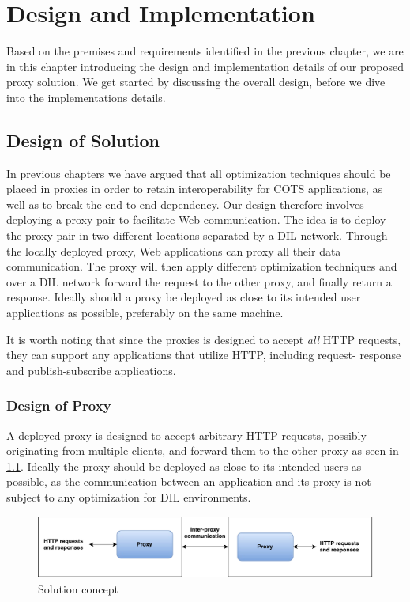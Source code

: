 \chapter{Design and Implementation}
\label{chapter:design}

Based on the premises and requirements identified in the previous chapter, we
are in this chapter introducing the design and implementation details of our
proposed proxy solution. We get started by discussing the overall design, before
we dive into the implementations details.

\section{Design of Solution}

In previous chapters we have argued that all optimization techniques should be
placed in proxies in order to retain interoperability for COTS applications, as
well as to break the end-to-end dependency. Our design therefore involves
deploying a proxy pair to facilitate Web communication. The idea is to deploy
the proxy pair in two different locations separated by a DIL network. Through
the locally deployed proxy, Web applications can proxy all their data
communication. The proxy will then apply different optimization techniques and
over a DIL network forward the request to the other proxy, and finally return a
response. Ideally should a proxy be deployed as close to its intended user
applications as possible, preferably on the same machine.

It is worth noting that since the proxies is designed to accept \textit{all} HTTP
requests, they can support any applications that utilize HTTP, including request-
response and publish-subscribe applications.


\subsection{Design of Proxy}

A deployed proxy is designed to accept arbitrary HTTP requests, possibly
originating from multiple clients, and forward them to the other proxy as seen
in \cref{figure:proxy_design}. Ideally the proxy should be deployed as close to
its intended users as possible, as the communication between an application and
its proxy is not subject to any optimization for DIL environments.

\begin{figure}[h]
\includegraphics[scale=0.55]{images/proxy_design.pdf}
\caption{Solution concept}
\label{figure:proxy_design}
\end{figure}

